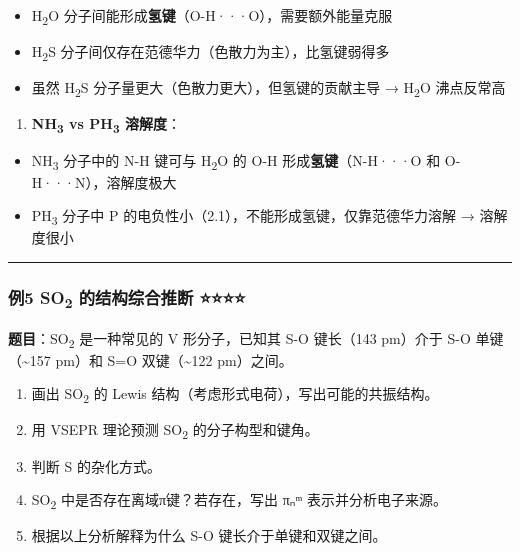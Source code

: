 \documentclass[a4paper,11pt]{ctexart}
\providecommand{\tightlist}{\setlength{\itemsep}{0pt}\setlength{\parskip}{0pt}}
\begin{document}
\begin{itemize}
\tightlist
\item
  H\textsubscript{2}O 分子间能形成\textbf{氢键}（O-H···O），需要额外能量克服
\item
  H\textsubscript{2}S 分子间仅存在范德华力（色散力为主），比氢键弱得多
\item
  虽然 H\textsubscript{2}S 分子量更大（色散力更大），但氢键的贡献主导 → H\textsubscript{2}O 沸点反常高
\end{itemize}

\begin{enumerate}
\def\labelenumi{(\arabic{enumi})}
\setcounter{enumi}{1}
\tightlist
\item
  \textbf{NH\textsubscript{3} vs PH\textsubscript{3} 溶解度}：
\end{enumerate}

\begin{itemize}
\tightlist
\item
  NH\textsubscript{3} 分子中的 N-H 键可与 H\textsubscript{2}O 的 O-H 形成\textbf{氢键}（N-H···O 和 O-H···N），溶解度极大
\item
  PH\textsubscript{3} 分子中 P 的电负性小（2.1），不能形成氢键，仅靠范德华力溶解 → 溶解度很小
\end{itemize}

\begin{center}\rule{0.5\linewidth}{0.5pt}\end{center}

\subsubsection{\texorpdfstring{例5 SO\textsubscript{2} 的结构综合推断 ⭐⭐⭐⭐}{例5 SO2 的结构综合推断 ⭐⭐⭐⭐}}\label{ux4f8b5-so2-ux7684ux7ed3ux6784ux7efcux5408ux63a8ux65ad}

\textbf{题目}：SO\textsubscript{2} 是一种常见的 V 形分子，已知其 S-O 键长（143 pm）介于 S-O 单键（\textasciitilde157 pm）和 S=O 双键（\textasciitilde122 pm）之间。

\begin{enumerate}
\def\labelenumi{(\arabic{enumi})}
\tightlist
\item
  画出 SO\textsubscript{2} 的 Lewis 结构（考虑形式电荷），写出可能的共振结构。
\item
  用 VSEPR 理论预测 SO\textsubscript{2} 的分子构型和键角。
\item
  判断 S 的杂化方式。
\item
  SO\textsubscript{2} 中是否存在离域π键？若存在，写出 πₙᵐ 表示并分析电子来源。
\item
  根据以上分析解释为什么 S-O 键长介于单键和双键之间。
\end{enumerate}
\end{document}
